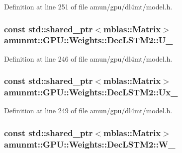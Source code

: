 Definition at line 251 of file amun/gpu/dl4mt/model.\+h.

\subsubsection[{\texorpdfstring{U\+\_\+}{U_}}]{\setlength{\rightskip}{0pt plus 5cm}const std\+::shared\+\_\+ptr$<${\bf mblas\+::\+Matrix}$>$ amunmt\+::\+G\+P\+U\+::\+Weights\+::\+Dec\+L\+S\+T\+M2\+::\+U\+\_\+}\hypertarget{structamunmt_1_1GPU_1_1Weights_1_1DecLSTM2_a8f38b72c8a7fc53154042bf7a9715da5}{}\label{structamunmt_1_1GPU_1_1Weights_1_1DecLSTM2_a8f38b72c8a7fc53154042bf7a9715da5}


Definition at line 246 of file amun/gpu/dl4mt/model.\+h.

\subsubsection[{\texorpdfstring{Ux\+\_\+}{Ux_}}]{\setlength{\rightskip}{0pt plus 5cm}const std\+::shared\+\_\+ptr$<${\bf mblas\+::\+Matrix}$>$ amunmt\+::\+G\+P\+U\+::\+Weights\+::\+Dec\+L\+S\+T\+M2\+::\+Ux\+\_\+}\hypertarget{structamunmt_1_1GPU_1_1Weights_1_1DecLSTM2_a1adb7f081ddd863e8e65c491ddb8d484}{}\label{structamunmt_1_1GPU_1_1Weights_1_1DecLSTM2_a1adb7f081ddd863e8e65c491ddb8d484}


Definition at line 249 of file amun/gpu/dl4mt/model.\+h.

\subsubsection[{\texorpdfstring{W\+\_\+}{W_}}]{\setlength{\rightskip}{0pt plus 5cm}const std\+::shared\+\_\+ptr$<${\bf mblas\+::\+Matrix}$>$ amunmt\+::\+G\+P\+U\+::\+Weights\+::\+Dec\+L\+S\+T\+M2\+::\+W\+\_\+}\hypertarget{structamunmt_1_1GPU_1_1Weights_1_1DecLSTM2_a6d1d64dcc62bfaaa0ee85a5c723a32ce}{}\label{structamunmt_1_1GPU_1_1Weights_1_1DecLSTM2_a6d1d64dcc62bfaaa0ee85a5c723a32ce}



